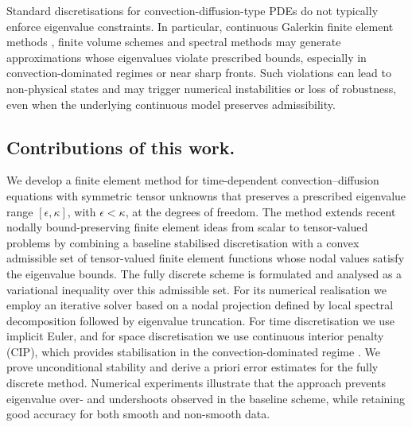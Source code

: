 \documentclass[final,12pt]{amsart}
\theoremstyle{plain}
\theoremstyle{definition}
\begin{document}
Standard discretisations for convection-diffusion-type PDEs do not
typically enforce eigenvalue constraints. In particular, continuous
Galerkin finite element methods \cite{EG21-I,Brenner2008}, finite
volume schemes \cite{LeVeque2002} and spectral methods
\cite{Canuto2007} may generate approximations whose eigenvalues
violate prescribed bounds, especially in convection-dominated regimes
or near sharp fronts. Such violations can lead to non-physical states
and may trigger numerical instabilities or loss of robustness, even
when the underlying continuous model preserves admissibility.

\subsection*{Contributions of this work.}
We develop a finite element method for time-dependent
convection--diffusion equations with symmetric tensor unknowns that
preserves a prescribed eigenvalue range $[\epsilon,\kappa]$, with
$\epsilon < \kappa$, at the degrees of freedom. The method extends
recent nodally bound-preserving finite element ideas from scalar to
tensor-valued problems by combining a baseline stabilised
discretisation with a convex admissible set of tensor-valued finite
element functions whose nodal values satisfy the eigenvalue bounds.
The fully discrete scheme is formulated and analysed as a variational
inequality over this admissible set. For its numerical realisation we
employ an iterative solver based on a nodal projection defined by local
spectral decomposition followed by eigenvalue truncation. For time
discretisation we use implicit Euler, and for space discretisation we
use continuous interior penalty (CIP), which provides stabilisation in
the convection-dominated regime \cite{MR2068903,BF09}. We prove
unconditional stability and derive a priori error estimates for the
fully discrete method. Numerical experiments illustrate that the
approach prevents eigenvalue over- and undershoots observed in the
baseline scheme, while retaining good accuracy for both smooth and
non-smooth data.
\end{document}
